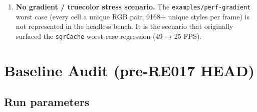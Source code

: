\begin{enumerate}
  \textbf{\texttt{s\allowbreak{}t\allowbreak{}y\allowbreak{}l\allowbreak{}e\allowbreak{}d\allowbreak{}.\allowbreak{}d\allowbreak{}i\allowbreak{}f\allowbreak{}f\allowbreak{}.\allowbreak{}m\allowbreak{}e\allowbreak{}d\allowbreak{}i\allowbreak{}u\allowbreak{}m} uses the legacy \texttt{s\allowbreak{}u\allowbreak{}r\allowbreak{}f\allowbreak{}a\allowbreak{}c\allowbreak{}e\allowbreak{}.\allowbreak{}s\allowbreak{}e\allowbreak{}t\allowbreak{}(\allowbreak{}\{\allowbreak{}c\allowbreak{}h\allowbreak{}a\allowbreak{}r\allowbreak{},\allowbreak{}f\allowbreak{}g\allowbreak{},\allowbreak{}b\allowbreak{}g\allowbreak{}\}\allowbreak{})} API, not \texttt{s\allowbreak{}e\allowbreak{}t\allowbreak{}R\allowbreak{}G\allowbreak{}B}.} The underlying surface is a \texttt{P\allowbreak{}a\allowbreak{}c\allowbreak{}k\allowbreak{}e\allowbreak{}d\allowbreak{}S\allowbreak{}u\allowbreak{}r\allowbreak{}f\allowbreak{}a\allowbreak{}c\allowbreak{}e} either way, but the paint code path going into the diff is the hex-string-parsing path, not the byte-passing fast path. A \texttt{s\allowbreak{}e\allowbreak{}t\allowbreak{}R\allowbreak{}G\allowbreak{}B} variant should be added.
\item
  \textbf{No gradient / truecolor stress scenario.} The \texttt{e\allowbreak{}x\allowbreak{}a\allowbreak{}m\allowbreak{}p\allowbreak{}l\allowbreak{}e\allowbreak{}s\allowbreak{}/\allowbreak{}p\allowbreak{}e\allowbreak{}r\allowbreak{}f\allowbreak{}-\allowbreak{}g\allowbreak{}r\allowbreak{}a\allowbreak{}d\allowbreak{}i\allowbreak{}e\allowbreak{}n\allowbreak{}t} worst case (every cell a unique RGB pair, 9168+ unique styles per frame) is not represented in the headless bench. It is the scenario that originally surfaced the \texttt{s\allowbreak{}g\allowbreak{}r\allowbreak{}C\allowbreak{}a\allowbreak{}c\allowbreak{}h\allowbreak{}e} worst-case regression (49 → 25 FPS).
\end{enumerate}

\section{Baseline Audit (pre-RE017 HEAD)}\label{record-422-baseline-audit-pre-re017-head}

\subsection{Run parameters}\label{record-422-run-parameters}


